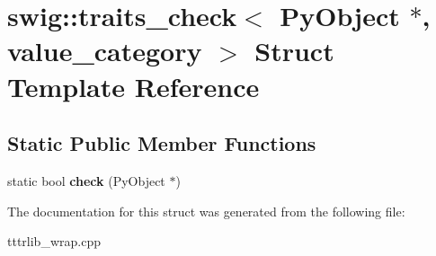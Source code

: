 \hypertarget{structswig_1_1traits__check_3_01_py_object_01_5_00_01value__category_01_4}{}\section{swig\+:\+:traits\+\_\+check$<$ Py\+Object $\ast$, value\+\_\+category $>$ Struct Template Reference}
\label{structswig_1_1traits__check_3_01_py_object_01_5_00_01value__category_01_4}
\subsection*{Static Public Member Functions}
\begin{DoxyCompactItemize}
\item 
\mbox{\label{structswig_1_1traits__check_3_01_py_object_01_5_00_01value__category_01_4_a4242a4f3371216574fd46f69b5fa0a23}} 
static bool {\bfseries check} (Py\+Object $\ast$)
\end{DoxyCompactItemize}


The documentation for this struct was generated from the following file\+:\begin{DoxyCompactItemize}
\item 
tttrlib\+\_\+wrap.\+cpp\end{DoxyCompactItemize}
